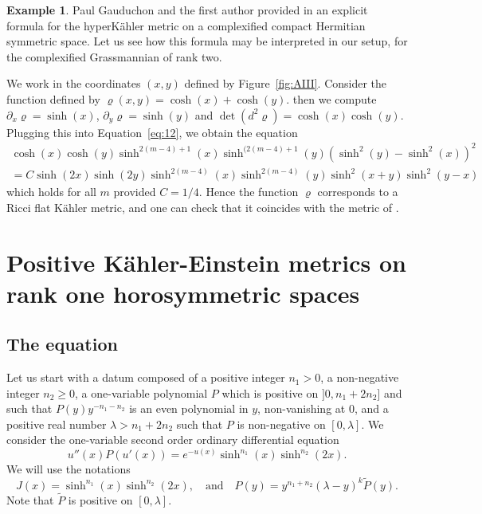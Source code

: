 \documentclass[JEP,XML,SOM,Unicode, NoEqCountersInSection, NoFloatCountersInSection]{cedram}
\theoremstyle{plain}
\theoremstyle{definition}
\newtheorem{exa}[thm]{Example}
\begin{document}
\begin{exa}
Paul Gauduchon and the first author provided in \cite{BG96} an explicit formula
for the hyperKähler metric on a complexified compact Hermitian symmetric space.
Let us see how this formula may be interpreted in our setup, for the
complexified Grassmannian of rank two.

We work in the coordinates $(x,y)$ defined by Figure~\ref{fig:AIII}.
Consider the function defined by $\varrho(x,y)=\cosh(x)+\cosh(y)$.
then we compute $\partial_x\varrho=\sinh(x)$, $\partial_y\varrho=\sinh(y)$ and
$\det(d^2\varrho)=\cosh(x)\cosh(y)$.
Plugging this into Equation~\ref{eq:12}, we obtain the equation
\begin{multline*}
\cosh(x)\cosh(y)\sinh^{2(m-4)+1}(x)\sinh^{(2(m-4)+1}(y)(\sinh^2(y)-\sinh^2(x))^2\\
=C\sinh(2x)\sinh(2y)\sinh^{2(m-4)}(x)\sinh^{2(m-4)}(y)\sinh^2(x+y)\sinh^2(y-x)
\end{multline*}
which holds for all $m$ provided $C=1/4$. Hence the function $\varrho$
corresponds to a Ricci flat Kähler metric, and one can check that it coincides
with the metric of \cite{BG96}.
\end{exa}

\section{Positive Kähler-Einstein metrics on rank one horosymmetric spaces}
\label{sec:KE}

\subsection{The equation}

Let us start with a datum composed of
a positive integer $n_1>0$, a non-negative integer $n_2\geq 0$,
a one-variable polynomial $P$ which is positive on $]0,n_1+2n_2]$ and such that
	$P(y)y^{-n_1-n_2}$ is an even polynomial in $y$, non-vanishing at $0$,
and a positive real number $\lambda>n_1+2n_2$ such that $P$ is non-negative on $[0,\lambda]$.
We consider the one-variable second order ordinary differential equation
\begin{equation}
\label{eqn_genKE}
u''(x)P(u'(x))=e^{-u(x)}\sinh^{n_1}(x)\sinh^{n_2}(2x).
\end{equation}
We will use the notations
$$J(x)=\sinh^{n_1}(x)\sinh^{n_2}(2x), \quad\text{and}\quad
P(y)=y^{n_1+n_2}(\lambda-y)^{k}\tilde{P}(y).$$ Note that
$\tilde{P}$ is positive on $[0,\lambda]$.
\end{document}
